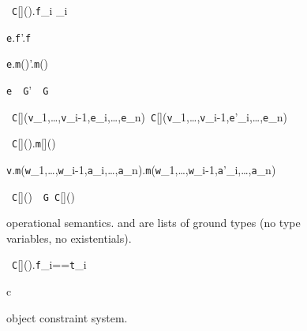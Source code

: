 \begin{figure*}
\vspace{-\bigskipamount}
\begin{minipage}{.33\textwidth}
\quad{}
	{\new~{\tt C}[]().{\tt f}_i _i}

	{{\tt e}.{\tt f}'.{\tt f}}

	{{\tt e}.{\tt m}()'.{\tt m}()}

	{{\tt e}~\as~{\tt G}'~\as~{\tt G}}
\end{minipage}%
\begin{minipage}{.67\textwidth}
\quad{}
	{\new~{\tt C}[]({\tt v}_1,\ldots,{\tt v}_{i-1},{\tt e}_i,\ldots,{\tt e}_n)\derives\new~{\tt C}[]({\tt v}_1,\ldots,{\tt v}_{i-1},{\tt e}'_i,\ldots,{\tt e}_n)}

	{\new~{\tt C}[]().{\tt m}[]()\theta}

	{{\tt v}.{\tt m}({\tt w}_1,\ldots,{\tt w}_{i-1},{\tt a}_i,\ldots,{\tt a}_n).{\tt m}({\tt w}_1,\ldots,{\tt w}_{i-1},{\tt a}'_i,\ldots,{\tt a}_n)}

	{\new~{\tt C}[]()~\as~{\tt G}\derives\new~{\tt C}[]()}
\end{minipage}
\caption{\FXGL{\cdot} operational semantics.  and  are lists of ground types (no type variables, no existentials).}
\label{fig:sos}
\end{figure*}


\begin{figure*}
\vspace{-\bigskipamount}
\begin{minipage}{.5\textwidth}
\quad{}
  {\vdashX \new~{\tt C}[]().{\tt f}_i=={\tt t}_i}
\end{minipage}%
\begin{minipage}{.5\textwidth}
\quad{}
  {\Gamma\vdash c}
\end{minipage}%
\caption{\FXGL{\cdot} object constraint system.}
\label{fig:object}
\end{figure*}


